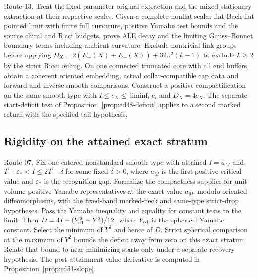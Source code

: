 \begin{openproblem}
\label{prob:ed06-ale-return}
Route 13. Treat the fixed-parameter original extraction and the mixed
stationary extraction at their respective scales. Given a complete
nonflat scalar-flat Bach-flat pointed limit with finite full curvature,
positive Yamabe test bounds and the source chiral and Ricci budgets,
prove ALE decay and the limiting Gauss--Bonnet boundary terms including
ambient curvature. Exclude nontrivial link groups before applying
$D_X=2(E_+(X)+E_-(X))+32\pi^2(k-1)$ to exclude $k\ge2$ by the
strict Ricci ceiling. On one connected truncated core with all end
buffers, obtain a coherent oriented embedding, actual collar-compatible
cap data and forward and inverse smooth comparisons. Construct a
positive compactification on the same smooth type with
$I\le e_X\le\liminf_i e_i$ and $D_X=4e_X$. The separate
start-deficit test of Proposition~\ref{prop:ed48-deficit} applies to
a second marked return with the specified tail hypothesis.
\end{openproblem}

\subsection{Rigidity on the attained exact stratum}

\begin{openproblem}
\label{prob:ed06-least-ricci}
Route 07. Fix one entered nonstandard smooth type with attained
$I=a_M$ and $T+\varepsilon_*<I\le 2T-\delta$ for some fixed $\delta>0$,
where $a_M$ is the first positive critical value and $\varepsilon_*$ is
the recognition gap. Formalize
the compactness supplier for unit-volume positive Yamabe representatives
at the exact value $a_M$, modulo oriented diffeomorphisms, with the
fixed-band marked-neck and same-type strict-drop hypotheses. Pass the
Yamabe inequality and equality for constant tests to the limit. Then
$D=4I-(Y_{\rm rd}^2-Y^2)/12$, where $Y_{\rm rd}$ is the spherical
Yamabe constant. Select the minimum of $Y^2$ and hence of $D$.
Strict spherical comparison at the maximum of $Y^2$ bounds the deficit
away from zero on this exact stratum. Relate that bound to near-minimizing
starts only under a separate recovery hypothesis. The post-attainment value derivative is computed in Proposition~\ref{prop:ed51-slope}.
\end{openproblem}

